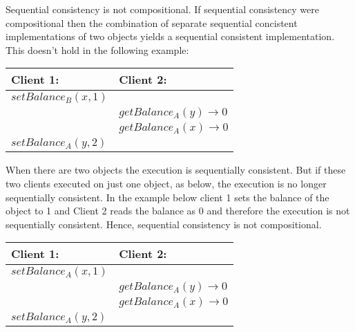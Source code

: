 \documentclass[a4paper]{article}
\newcommand{\solution}[2][]{
  \ifthenelse{\equal{#1}{} \or \equal{#1}{a}}{\\[3pt]\textit{Solution: }\\[0.1cm]}{}
  \parbox[t]{\textwidth}{
    \ifthenelse{\equal{#1}{}}{}{#1)}
    \parbox[t]{0.95\textwidth}{#2}}\\
}
\begin{document}
\solution[b]{
  Sequential consistency is not compositional. If sequential consistency
  were compositional then the combination of separate sequential
  concistent implementations of two objects yields a sequential
  consistent implementation. This doesn't hold in the following example:
  \begin{center}
    \begin{tabular}{| l | l |}\hline
      Client 1: & Client 2: \\\hline
      $setBalance_B(x, 1)$ &\\
      & $getBalance_A(y) \rightarrow 0$\\
      & $getBalance_A(x) \rightarrow 0$\\
      $setBalance_A(y, 2)$ &\\\hline
    \end{tabular}
  \end{center}
  When there are two objects the execution is sequentially
  consistent. But if these two clients executed on just one object, as
  below, the execution is no longer sequentially consistent. In the
  example below client 1 sets the balance of the object to 1 and Client
  2 reads the balance as 0 and therefore the execution is not
  sequentially consistent. Hence, sequential consistency is not
  compositional.
  \begin{center}
    \begin{tabular}{| l | l |}\hline
      Client 1: & Client 2: \\\hline
      $setBalance_A(x, 1)$ &\\
      & $getBalance_A(y) \rightarrow 0$\\
      & $getBalance_A(x) \rightarrow 0$\\
      $setBalance_A(y, 2)$ &\\\hline
    \end{tabular}
  \end{center}
}
\end{document}
